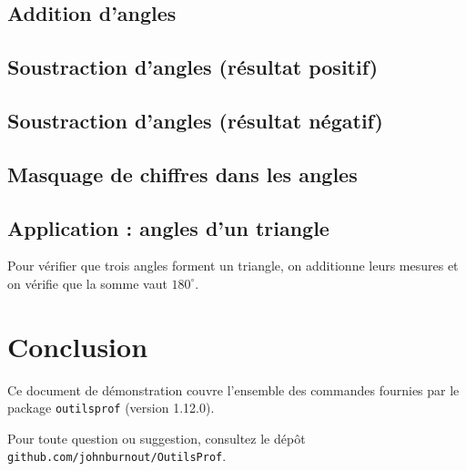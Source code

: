 \documentclass[11pt,a4paper]{article}
\begin{document}
\subsection{Addition d'angles}



\subsection{Soustraction d'angles (résultat positif)}



\subsection{Soustraction d'angles (résultat négatif)}


\subsection{Masquage de chiffres dans les angles}

\begin{center}
\end{center}

\subsection{Application : angles d'un triangle}

\begin{methode}
    Pour vérifier que trois angles forment un triangle, on
    additionne leurs mesures et on vérifie que la somme vaut
    $180^\circ$.
\end{methode}


\section*{Conclusion}

Ce document de démonstration couvre l'ensemble des commandes
fournies par le package \texttt{outilsprof} (version 1.12.0).

\vspace{1cm}

\begin{retenir}
    Pour toute question ou suggestion, consultez le dépôt
    \texttt{github.com/johnburnout/OutilsProf}.
\end{retenir}
\end{document}
